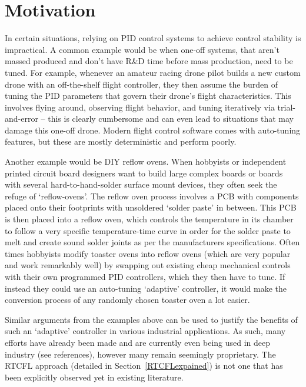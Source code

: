 \documentclass[10pt,twocolumn,letterpaper]{article}
\begin{document}
    \section{Motivation} \label{motivation}
        
        In certain situations, relying on PID control systems to achieve control stability is impractical. A common
        example would be when one-off systems, that aren't massed produced and don't have R\&D time before mass
        production, need to be tuned. For example, whenever an amateur racing drone pilot builds a new custom drone with
        an off-the-shelf flight controller, they then assume the burden of tuning the PID parameters that govern their
        drone's flight characteristics. This involves flying around, observing flight behavior, and tuning iteratively
        via trial-and-error -- this is clearly cumbersome and can even lead to situations that may damage this one-off
        drone. Modern flight control software comes with auto-tuning features, but these are mostly deterministic and
        perform poorly.

        Another example would be DIY reflow ovens. When hobbyists or independent printed circuit board designers want to
        build large complex boards or boards with several hard-to-hand-solder surface mount devices, they often seek the
        refuge of `reflow-ovens'. The reflow oven process involves a PCB with components placed onto their footprints
        with unsoldered `solder paste' in between. This PCB is then placed into a reflow oven, which controls the
        temperature in its chamber to follow a very specific temperature-time curve in order for the solder paste to
        melt and create sound solder joints as per the manufacturers specifications. Often times hobbyists modify
        toaster ovens into reflow ovens (which are very popular and work remarkably well) by swapping out existing cheap
        mechanical controls with their own programmed PID controllers, which they then have to tune. If instead they
        could use an auto-tuning `adaptive' controller, it would make the conversion process of any randomly chosen
        toaster oven a lot easier.

        Similar arguments from the examples above can be used to justify the benefits of such an `adaptive' controller
        in various industrial applications. As such, many efforts have already been made and are currently even being
        used in deep industry (see references), however many remain seemingly proprietary. The RTCFL approach (detailed
        in Section~\ref{RTCFLexpained}) is not one that has been explicitly observed yet in existing literature.
        
\end{document}
